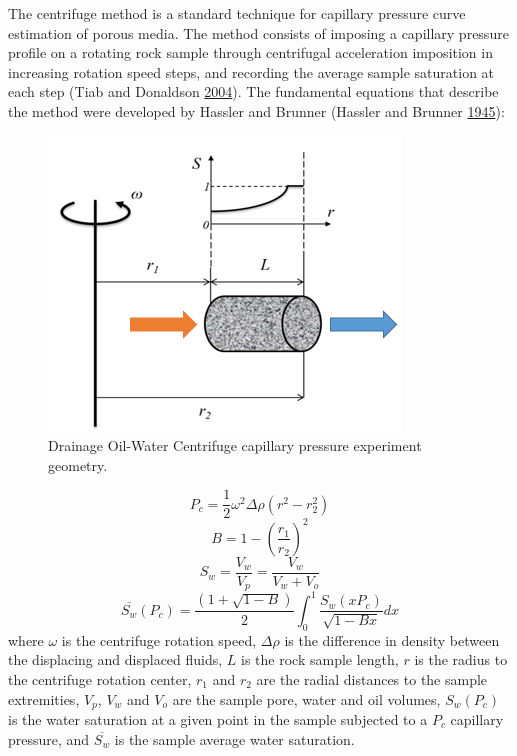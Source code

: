 \documentclass[english,msc,numbers]{coppe}
\begin{document}
  The centrifuge method is a standard technique for capillary pressure curve estimation of porous media. The method consists of imposing a capillary pressure profile on a rotating rock sample through centrifugal acceleration imposition in increasing rotation speed steps, and recording the average sample saturation at each step (Tiab and Donaldson \protect\hyperlink{ref-Tiab2004}{2004}). The fundamental equations that describe the method were developed by Hassler and Brunner (Hassler and Brunner \protect\hyperlink{ref-Hassler1945}{1945}):
  \begin{figure}
  
  {\centering \includegraphics[width=0.6\linewidth]{figure/2-7-centrifuge-geometry} 
  
  }
  
  \caption{Drainage Oil-Water Centrifuge capillary pressure experiment geometry.}\label{fig:centrifuge-geometry}
  \end{figure}
  \begin{equation} 
    P_c = \frac{1}{2}\omega^2\Delta \rho (r^2-r_{2}^{2})
    \label{eq:pc}
  \end{equation}
  \begin{equation} 
    B = 1 - (\frac{r_1}{r_2})^2
    \label{eq:B}
  \end{equation}
  \begin{equation} 
    S_w = \frac{V_w}{V_p} = \frac{V_w}{V_w + V_o}
    \label{eq:Sw}
  \end{equation}
  \begin{equation} 
    \overline{S_w}(P_c)=\frac{(1+\sqrt{1-B})}{2}\int_0^1{\frac{S_w(xP_c)}{\sqrt{1-Bx}}} dx
    \label{eq:meansw}
  \end{equation}
  where \(\omega\) is the centrifuge rotation speed, \(\Delta \rho\) is the difference in density between the displacing and displaced fluids, \(L\) is the rock sample length, \(r\) is the radius to the centrifuge rotation center, \(r_1\) and \(r_2\) are the radial distances to the sample extremities, \(V_p\), \(V_w\) and \(V_o\) are the sample pore, water and oil volumes, \(S_w (P_c)\) is the water saturation at a given point in the sample subjected to a \(P_c\) capillary pressure, and \(\overline{S_w}\) is the sample average water saturation.
  
\end{document}

